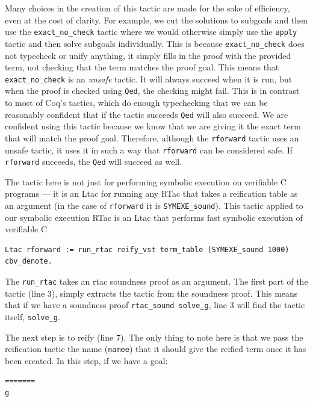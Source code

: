 \documentclass{puthesis}
\begin{document}
Many choices in the creation of this tactic are made for the sake of
efficiency, even at the cost of clarity. For example, we cut the
solutions to subgoals and then use the
\lstinline|exact_no_check| tactic where we would otherwise simply use
the 
\lstinline|apply|
tactic and then solve subgoals individually. This is because
\lstinline|exact_no_check| does not typecheck or unify anything, it simply
fills in the proof with the provided term, not checking that the term
matches the proof goal. This means that \lstinline|exact_no_check| is
an \emph{unsafe} tactic. It will always succeed when it is run, but
when the proof is checked using \lstinline|Qed|, the checking might
fail. This is in contrast to most of Coq's tactics, which do enough
typechecking that we can be reasonably confident that if the tactic
succeeds \lstinline|Qed| will also succeed. We are confident using
this tactic because we know that we are giving it the exact term that
will match the proof goal. Therefore, although the \lstinline|rforward| tactic uses an unsafe
tactic, it uses it in such a way that \lstinline|rforward| can be
considered safe. If \lstinline|rforward| succeeds, the \lstinline|Qed| will succeed as
well.

The tactic here is not just for performing symbolic execution on verifiable
C programs --- it is an Ltac for running any RTac that takes a
reification table as an argument (in the case of \lstinline|rforward|
it is \lstinline|SYMEXE_sound|). This tactic applied to our symbolic
execution RTac is an Ltac that performs fast symbolic execution of
verifiable C

\begin{lstlisting}
Ltac rforward := run_rtac reify_vst term_table (SYMEXE_sound 1000) cbv_denote.
\end{lstlisting}

The \lstinline|run_rtac| takes an rtac soundness proof as an
argument. The first part of the tactic (line 3), simply
extracts the tactic from the soundness proof. This means that if we
have a soundness proof \lstinline|rtac_sound solve_g|, line 3 will
find the tactic itself, \lstinline|solve_g|.

The next step is to reify (line 7). The only thing to note here is
that we pass the reification tactic the name (\lstinline|namee|) that
it should give the reified term once it has been created. In this
step, if we have a goal:

\begin{lstlisting}
=======
g
\end{lstlisting}
\end{document}
